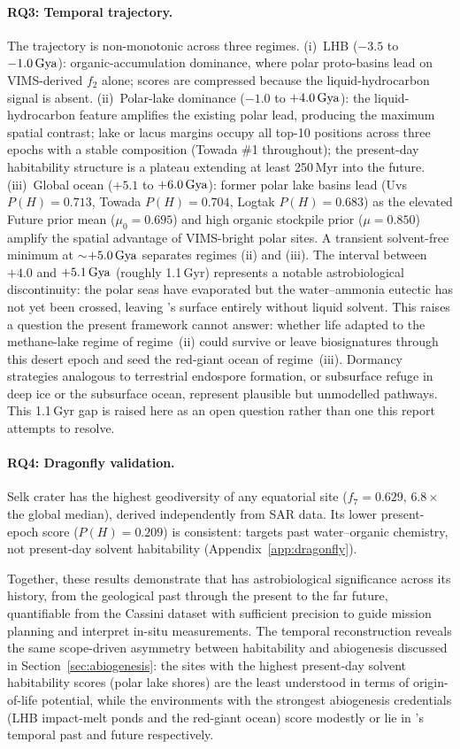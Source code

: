 \paragraph{RQ3: Temporal trajectory.}
The trajectory is non-monotonic across three regimes.  (i)~LHB ($-3.5$ to $-1.0\,\text{Gya}$): organic-accumulation dominance, where polar proto-basins lead on VIMS-derived $f_2$ alone; scores are compressed because the liquid-hydrocarbon signal is absent.  (ii)~Polar-lake dominance ($-1.0$ to $+4.0\,\text{Gya}$): the liquid-hydrocarbon feature amplifies the existing polar lead, producing the maximum spatial contrast; lake or lacus margins occupy all top-10 positions across three epochs with a stable composition (Towada \#1 throughout); the present-day habitability structure is a plateau extending at least 250\,Myr into the future.  (iii)~Global ocean ($+5.1$ to $+6.0\,\text{Gya}$): former polar lake basins lead (Uvs $P(H){=}0.713$, Towada $P(H){=}0.704$, Logtak $P(H){=}0.683$) as the elevated Future prior mean ($\mu_0{=}0.695$) and high organic stockpile prior ($\mu{=}0.850$) amplify the spatial advantage of VIMS-bright polar sites.  A transient solvent-free minimum at $\sim$$+5.0\,\text{Gya}$ separates regimes (ii) and (iii).  The interval between $+4.0$ and $+5.1\,\text{Gya}$ (roughly 1.1\,Gyr) represents a notable astrobiological discontinuity: the polar seas have evaporated but the water--ammonia eutectic has not yet been crossed, leaving \titan{}'s surface entirely without liquid solvent.  This raises a question the present framework cannot answer: whether life adapted to the methane-lake regime of regime~(ii) could survive or leave biosignatures through this desert epoch and seed the red-giant ocean of regime~(iii).  Dormancy strategies analogous to terrestrial endospore formation, or subsurface refuge in deep ice or the subsurface ocean, represent plausible but unmodelled pathways.  This 1.1\,Gyr gap is raised here as an open question rather than one this report attempts to resolve.

\paragraph{RQ4: Dragonfly validation.}
Selk crater has the highest geodiversity of any equatorial site ($f_7{=}0.629$, $6.8\times$ the global median), derived independently from SAR data.  Its lower present-epoch score ($P(H){=}0.209$) is consistent: \dragonfly{} targets past water--organic chemistry, not present-day solvent habitability (Appendix~\ref{app:dragonfly}).

\bigskip
Together, these results demonstrate that \titan{} has astrobiological significance across its history, from the geological past through the present to the far future, quantifiable from the Cassini dataset with sufficient precision to guide mission planning and interpret in-situ measurements.  The temporal reconstruction reveals the same scope-driven asymmetry between habitability and abiogenesis discussed in Section~\ref{sec:abiogenesis}: the sites with the highest present-day solvent habitability scores (polar lake shores) are the least understood in terms of origin-of-life potential, while the environments with the strongest abiogenesis credentials (LHB impact-melt ponds and the red-giant ocean) score modestly or lie in \titan{}'s temporal past and future respectively.